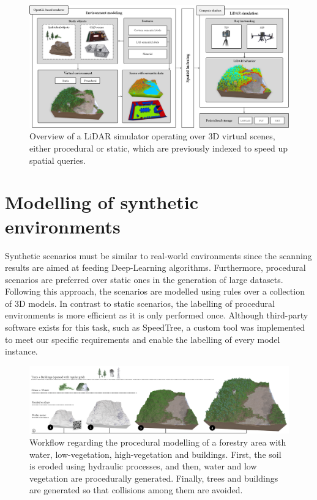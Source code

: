 \begin{figure}
    \centering
    \includegraphics[width=\linewidth]{figs/lidar_simulation/overview.png}
	\caption{Overview of a LiDAR simulator operating over 3D virtual scenes, either procedural or static, which are previously indexed to speed up spatial queries. }
	\label{fig:lidar_overview}
\end{figure}

\section{Modelling of synthetic environments}

Synthetic scenarios must be similar to real-world environments since the scanning results are aimed at feeding Deep-Learning algorithms. Furthermore, procedural scenarios are preferred over static ones in the generation of large datasets. Following this approach, the scenarios are modelled using rules over a collection of 3D models. In contrast to static scenarios, the labelling of procedural environments is more efficient as it is only performed once. Although third-party software exists for this task, such as SpeedTree\textregistered, a custom tool was implemented to meet our specific requirements and enable the labelling of every model instance. 

\begin{figure}
    \centering
    \includegraphics[width=\linewidth]{figs/lidar_simulation/procedural_workflow.png}
	\caption{Workflow regarding the procedural modelling of a forestry area with water, low-vegetation, high-vegetation and buildings. First, the soil is eroded using hydraulic processes, and then, water and low vegetation are procedurally generated. Finally, trees and buildings are generated so that collisions among them are avoided. }
	\label{fig:procedural_workflow}
\end{figure}

